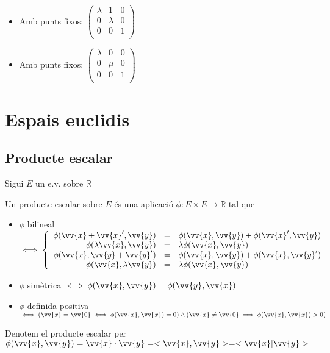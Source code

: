 \begin{itemize}
\begin{itemize}
		\item Amb punts fixos: $\left(\begin{array}{cc|c}\lambda&1&0\\0&\lambda &0\\\hline0&0&1\\\end{array}\right)$
		\item Amb punts fixos: $\left(\begin{array}{cc|c}\lambda&0&0\\0&\mu &0\\\hline0&0&1\\\end{array}\right)$
	\end{itemize}
\end{itemize}

\section{Espais euclidis}

\subsection{Producte escalar}

Sigui $E$ un e.v. sobre $\mathbb{R}$

\begin{defn}
	Un producte escalar sobre $E$ és una aplicació $\phi:E\times E\to\mathbb{R}$ tal que
	\begin{itemize}
		\item $\phi$ bilineal $\iff\left\{\begin{array}{rcl}\phi(\vv{x}+\vv{x}',\vv{y})&=&\phi(\vv{x},\vv{y})+\phi(\vv{x}',\vv{y})\\\phi(\lambda \vv{x},\vv{y})&=&\lambda\phi(\vv{x},\vv{y})\\\phi(\vv{x},\vv{y}+\vv{y}')&=&\phi(\vv{x},\vv{y})+\phi(\vv{x},\vv{y}')\\\phi(\vv{x},\lambda \vv{y})&=&\lambda\phi(\vv{x},\vv{y})\\\end{array}\right.$
		\item $\phi$ simètrica $\iff\phi(\vv{x},\vv{y})=\phi(\vv{y},\vv{x})$
		\item $\phi$ definida positiva $\iff(\vv{x}=\vv{0}\iff\phi(\vv{x},\vv{x})=0)\land(\vv{x}\neq \vv{0}\implies\phi(\vv{x},\vv{x})>0)$
	\end{itemize}
	Denotem el producte escalar per $\phi(\vv{x},\vv{y})=\vv{x}\cdot\vv{y}=<\vv{x},\vv{y}>=<\vv{x}|\vv{y}>$
\end{defn}

